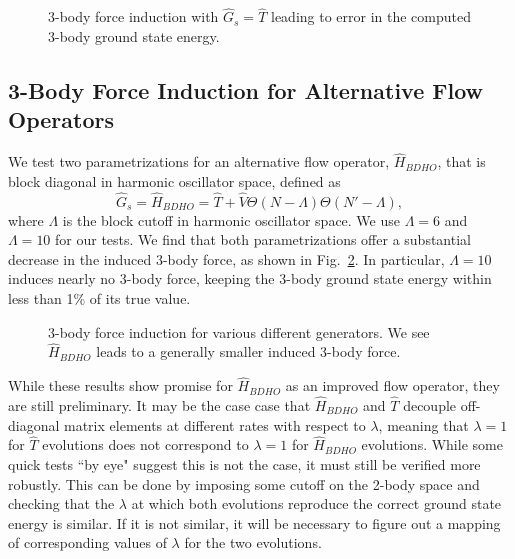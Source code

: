 \begin{figure}[t]
\begin{center}
\end{center}
\caption{3-body force induction with $\hat{G}_s=\hat{T}$ leading to error in the computed 3-body ground state energy.}
\label{fig:heinz_vfull}
\end{figure}

\subsection{3-Body Force Induction for Alternative Flow Operators}

We test two parametrizations for an alternative flow operator, $\hat{H}_{BDHO}$, that is block diagonal in harmonic oscillator space, defined as
\begin{equation}
\hat{G}_s = \hat{H}_{BDHO} = \hat{T} + \hat{V} \Theta(N - \Lambda) \Theta(N' - \Lambda),
\end{equation}
where $\Lambda$ is the block cutoff in harmonic oscillator space. We use $\Lambda=6$ and $\Lambda=10$ for our tests. We find that both parametrizations offer a substantial decrease in the induced 3-body force, as shown in Fig.~\ref{fig:heinz_newfull}. In particular, $\Lambda=10$ induces nearly no 3-body force, keeping the 3-body ground state energy within less than 1\% of its true value.

\begin{figure}[th!]
\begin{center}
\end{center}
\caption{3-body force induction for various different generators. We see $\hat{H}_{BDHO}$ leads to a generally smaller induced 3-body force.}
\label{fig:heinz_newfull}
\end{figure}

While these results show promise for $\hat{H}_{BDHO}$ as an improved flow operator, they are still preliminary. It may be the case case that $\hat{H}_{BDHO}$ and $\hat{T}$ decouple off-diagonal matrix elements at different rates with respect to $\lambda$, meaning that $\lambda=1$ for $\hat{T}$ evolutions does not correspond to $\lambda=1$ for $\hat{H}_{BDHO}$ evolutions. While some quick tests ``by eye" suggest this is not the case, it must still be verified more robustly. This can be done by imposing some cutoff on the 2-body space and checking that the $\lambda$ at which both evolutions reproduce the correct ground state energy is similar. If it is not similar, it will be necessary to figure out a mapping of corresponding values of $\lambda$ for the two evolutions.

